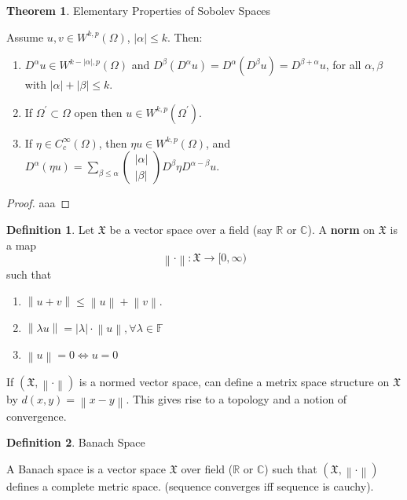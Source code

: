 \documentclass[12pt, a4paper]{article}
\theoremstyle{definition}
\newtheorem{thm}{Theorem}
\newtheorem{defn}{Definition}
\newcommand{\X}{\mathfrak{X}}
\newcommand{\R}{\mathbb{R}}                           %
\newcommand{\C}{\mathbb{C}}                           %
\newcommand{\F}{\mathbb{F}}                           %
\newcommand{\norm}[1]{\left\lVert#1\right\rVert}
\newcommand{\pmat}[1]{\begin{pmatrix}#1\end{pmatrix}}
\begin{document}
\begin{tcolorbox}
\begin{thm}
Elementary Properties of Sobolev Spaces
\end{thm}
	Assume $u,v \in W^{k,p}(\Omega)$, $|\alpha| \leq k$. Then: 
	\begin{enumerate}[label = \roman*)]
		\item $D^\alpha u \in W^{k-|\alpha|, p}(\Omega)$ and $D^\beta (D^\alpha u) = D^\alpha(D^\beta u) = D^{\beta + \alpha} u$, for all $\alpha, \beta$ with $|\alpha| + |\beta| \leq k$. 
		\item If $\Omega^\prime \subset \Omega$ open then $u\in W^{k,p}(\Omega^\prime)$. 
		\item If $\eta \in C_c^\infty(\Omega)$, then $\eta u \in W^{k,p}(\Omega)$, and
			$D^\alpha (\eta u) = \sum_{\beta \leq \alpha} \pmat{|\alpha |\\ |\beta|} D^\beta \eta D^{\alpha - \beta} u$. 
	\end{enumerate}
\end{tcolorbox}
\begin{proof}
aaa
\end{proof}
\begin{tcolorbox}[colback = white]
\begin{defn}
	Let $\X$ be a vector space over a field (say $\R$ or $\C$). A \textbf{norm} on $\X$ is a map
	$$ \norm{\cdot} : \X \to [0 , \infty) $$ such that
\begin{enumerate}[label = \roman*)]
	\item $\norm{u+v} \leq \norm{u} + \norm{v}.$
	\item $\norm{\lambda u} = |\lambda| \cdot \norm{u}, \forall \lambda \in \F$
	\item $\norm{u} = 0 \iff u = 0$
\end{enumerate}	
	If $(\X, \norm{\cdot})$ is a normed vector space, can define a metrix space structure on $\X$ by $d(x,y) = \norm{x -y}$. This gives rise to a topology and a notion of convergence. 
\end{defn}
\end{tcolorbox}
\begin{tcolorbox}[colback = white]
\begin{defn}
 Banach Space
\end{defn}
	A Banach space is a vector space $\X$ over field ($\R$ or $\C$) such that $(\X, \norm{\cdot })$ defines a complete metric space. (sequence converges iff sequence is cauchy). 
	
\end{tcolorbox}
\end{document}
